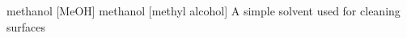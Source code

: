 \newglsXchemical%
{methanol}%
[MeOH]%
{methanol}%
[methyl alcohol]%
{}%
{A simple solvent used for cleaning surfaces}%